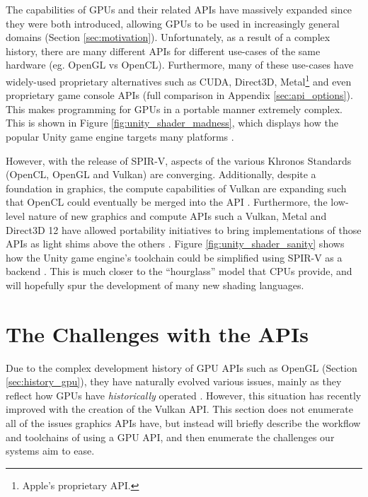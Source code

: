 \documentclass[a4paper,12pt,twoside,openright]{report}
\begin{document}
The capabilities of GPUs and their related APIs have massively expanded since
they were both introduced, allowing GPUs to be used in increasingly general
domains (Section \ref{sec:motivation}). Unfortunately, as a result of a complex
history, there are many different APIs for different use-cases of the same
hardware (eg. OpenGL vs OpenCL). Furthermore, many of these use-cases have
widely-used proprietary alternatives such as CUDA, Direct3D,
Metal\footnote{Apple's proprietary API.} and even proprietary game console APIs
\cite{CUDA} \cite{Metal} \cite{Direct3D} \cite{PS4PortCrew} (full comparison in
Appendix \ref{sec:api_options}). This makes programming for GPUs in a portable
manner extremely complex. This is shown in Figure
\ref{fig:unity_shader_madness}, which displays how the popular Unity game
engine targets many platforms \cite{UnityShaderPipeline}.

However, with the release of SPIR-V, aspects of the various Khronos Standards
(OpenCL, OpenGL and Vulkan) are converging. Additionally, despite a foundation
in graphics, the compute capabilities of Vulkan are expanding such that OpenCL
could eventually be merged into the API \cite{VulkanOpenCLMerge}. Furthermore,
the low-level nature of new graphics and compute APIs such a Vulkan, Metal and
Direct3D 12 have allowed portability initiatives to bring implementations of
those APIs as light shims above the others \cite{VulkanPortabilityInitiative}
\cite{VulkanPortabilityInitiativeAnnouncement}. Figure
\ref{fig:unity_shader_sanity} shows how the Unity game engine's toolchain could
be simplified using SPIR-V as a backend \cite{UnityShaderPipeline}. This is
much closer to the ``hourglass'' model that CPUs provide, and will hopefully
spur the development of many new shading languages.

\section{The Challenges with the APIs}

\label{sec:api_challanges}



Due to the complex development history of GPU APIs such as OpenGL (Section
\ref{sec:history_gpu}), they have naturally evolved various issues, mainly as
they reflect how GPUs have \textit{historically} operated \cite{TODO}. However,
this situation has recently improved with the creation of the Vulkan API. This
section does not enumerate all of the issues graphics APIs have, but instead
will briefly describe the workflow and toolchains of using a GPU API, and then
enumerate the challenges our systems aim to ease.
\end{document}
